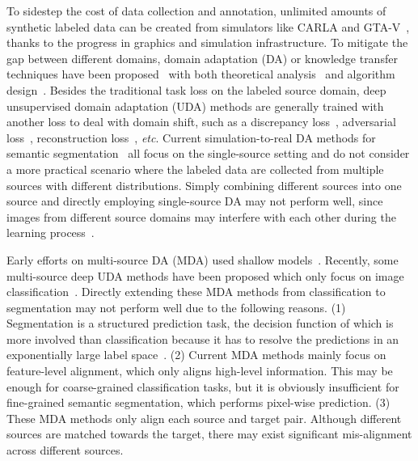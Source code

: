 \documentclass{article}
\begin{document}
To sidestep the cost of data collection and annotation, unlimited amounts of synthetic labeled data can be created from simulators like CARLA and GTA-V~\cite{richter2016playing,ros2016synthia,yue2018lidar}, thanks to the progress in graphics and simulation infrastructure. To mitigate the gap between different domains, domain adaptation (DA) or knowledge transfer techniques have been proposed~\cite{patel2015visual} with both theoretical analysis~\cite{ben2010theory,gopalan2014unsupervised,louizos2015variational,tzeng2017adversarial} and algorithm design~\cite{pan2010survey,glorot2011domain,jhuo2012robust,becker2013non,ghifary2015domain,long2015learning,hoffman2018cycada}. Besides the traditional task loss on the labeled source domain, deep unsupervised domain adaptation (UDA) methods are generally trained with another loss to deal with domain shift, such as a discrepancy loss~\cite{long2015learning,sun2016return,sun2017correlation,zhuo2017deep}, adversarial loss~\cite{goodfellow2014generative,bousmalis2017unsupervised,liu2016coupled,zhu2017unpaired,bousmalis2017unsupervised,zhao2018emotiongan,russo2018source,sankaranarayanan2018generate,hu2018duplex,hoffman2018cycada,zhao2019cycleemotiongan}, reconstruction loss~\cite{ghifary2015domain,ghifary2016deep,bousmalis2016domain}, \emph{etc}. Current simulation-to-real DA methods for semantic segmentation~\cite{hoffman2016fcns,zhang2017curriculum,peng2017visda,chen2018road,sankaranarayanan2018learning,zhang2018fully,hoffman2018cycada,dundar2018domain,zhu2018penalizing,wu2018dcan,yue2019domain} all focus on the single-source setting and do not consider a more practical scenario where the labeled data are collected from multiple sources with different distributions. Simply combining different sources into one source and directly employing single-source DA may not perform well, since images from different source domains may interfere with each other during the learning process~\cite{riemer2019learning}.





Early efforts on multi-source DA (MDA) used shallow models~\cite{sun2015survey,duan2009domain,sun2011two,duan2012exploiting,chattopadhyay2012multisource,duan2012domain,yang2007cross,schweikert2009empirical,xu2012multi,sun2013bayesian}. Recently, some multi-source deep UDA methods have been proposed which only focus on image classification~\cite{xu2018deep,zhao2018adversarial,peng2018moment}. Directly extending these MDA methods from classification to segmentation may not perform well due to the following reasons. (1) Segmentation is a structured prediction task, the decision function of which is more involved than classification because it has to resolve the predictions in an exponentially large label space~\cite{zhang2017curriculum,tsai2018learning}. (2) Current MDA methods mainly focus on feature-level alignment, which only aligns high-level information. This may be enough for coarse-grained classification tasks, but it is obviously insufficient for fine-grained semantic segmentation, which performs pixel-wise prediction. (3) These MDA methods only align each source and target pair. Although different sources are matched towards the target, there may exist significant mis-alignment across different sources.
\end{document}

